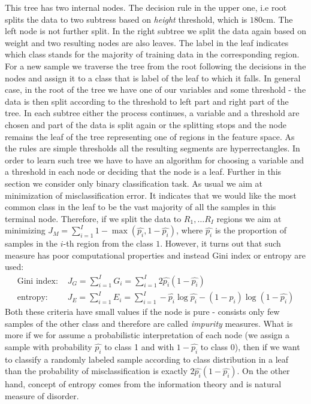 \documentclass[shortabstract, english, mgr]{iithesis}
\begin{document}
This tree has two internal nodes. The decision rule in the upper one, i.e root splits the data to two subtress based on \textit{height} threshold, which is $180$cm. The left node is not further split. In the right subtree we split the data again based on weight and two resulting nodes are also leaves. The label in the leaf indicates which class stands for the majority of training data in the corresponding region. For a new sample we traverse the tree from the root following the decisions in the nodes and assign it to a class that is label of the leaf to which it falls. In general case, in the root of the tree we have one of our variables and some threshold - the data is then split according to the threshold to left part and right part of the tree. In each subtree either the process continues, a variable and a threshold are chosen and part of the data is split again or the splitting stops and the node remains the leaf of the tree representing one of regions in the feature space. As the rules are simple thresholds all the resulting segments are hyperrectangles. In order to learn such tree we have to have an algorithm for choosing a variable and a threshold in each node or deciding that the node is a leaf. Further in this section we consider only binary classification task. As usual we aim at minimization of misclassification error. It indicates that we would like the most common class in the leaf to be the vast majority of all the samples in this terminal node. Therefore, if we split the data to $R_1, \ldots R_I$ regions we aim at minimizing $J_M = \sum_{i=1}^I 1 - \max(\hat{p_i}, 1-\hat{p_i})$, where $\hat{p_i}$ is the proportion of samples in the $i$-th region from the class $1$. However, it turns out that such measure has poor computational properties and instead Gini index or entropy are used:
\begin{align*}
        \text{Gini index:  } &J_G = \sum_{i=1}^I G_i = \sum_{i=1}^I 2\hat{p_i}(1-\hat{p_i}) \\
        \text{entropy:  } &J_E = \sum_{i=1}^I E_i= \sum_{i=1}^I -\hat{p_i}\log \hat{p_i} - (1-\hat{p_i}) \log (1-\hat{p_i})
\end{align*}
Both these criteria have small values if the node is pure - consists only few samples of the other class and therefore are called \textit{impurity} measures. What is more if we for assume a probabilistic interpretation of each node (we assign a sample with probability $\hat{p_i}$ to class 1 and with $1-\hat{p_i}$ to class 0), then if we want to classify a randomly labeled sample according to class distribution in a leaf than the probability of misclassification is exactly $2\hat{p_i}(1-\hat{p_i})$. On the other hand, concept of entropy comes from the information theory and is natural measure of disorder.
\end{document}
